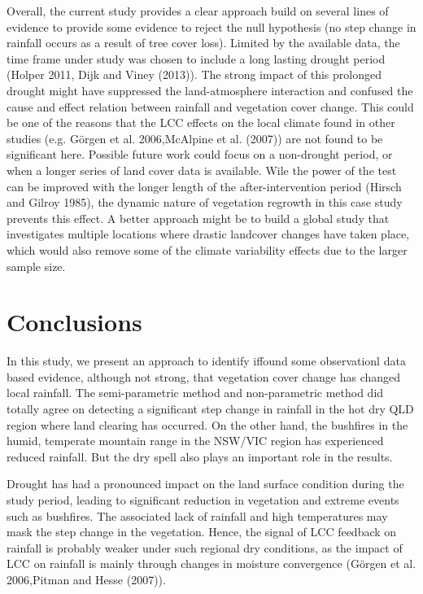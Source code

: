\documentclass[]{elsarticle} %
\theoremstyle{definition}
\theoremstyle{definition}
\theoremstyle{definition}
\theoremstyle{remark}
\begin{document}
Overall, the current study provides a clear approach build on several
lines of evidence to provide some evidence to reject the null hypothesis
(no step change in rainfall occurs as a result of tree cover loss).
Limited by the available data, the time frame under study was chosen to
include a long lasting drought period (Holper 2011, Dijk and Viney
(2013)). The strong impact of this prolonged drought might have
suppressed the land-atmosphere interaction and confused the cause and
effect relation between rainfall and vegetation cover change. This could
be one of the reasons that the LCC effects on the local climate found in
other studies (e.g. Görgen et al. 2006,McAlpine et al. (2007)) are not
found to be significant here. Possible future work could focus on a
non-drought period, or when a longer series of land cover data is
available. Wile the power of the test can be improved with the longer
length of the after-intervention period (Hirsch and Gilroy 1985), the
dynamic nature of vegetation regrowth in this case study prevents this
effect. A better approach might be to build a global study that
investigates multiple locations where drastic landcover changes have
taken place, which would also remove some of the climate variability
effects due to the larger sample size.

\section{Conclusions}\label{conclusions}

In this study, we present an approach to identify iffound some
observationl data based evidence, although not strong, that vegetation
cover change has changed local rainfall. The semi-parametric method and
non-parametric method did totally agree on detecting a significant step
change in rainfall in the hot dry QLD region where land clearing has
occurred. On the other hand, the bushfires in the humid, temperate
mountain range in the NSW/VIC region has experienced reduced rainfall.
But the dry spell also plays an important role in the results.

Drought has had a pronounced impact on the land surface condition during
the study period, leading to significant reduction in vegetation and
extreme events such as bushfires. The associated lack of rainfall and
high temperatures may mask the step change in the vegetation. Hence, the
signal of LCC feedback on rainfall is probably weaker under such
regional dry conditions, as the impact of LCC on rainfall is mainly
through changes in moisture convergence (Görgen et al. 2006,Pitman and
Hesse (2007)).
\end{document}
